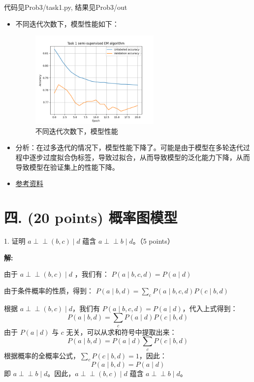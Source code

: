 \documentclass[8pt]{article}
\begin{document}
{\color{red}代码见Prob3/task1.py, 结果见Prob3/out}

\begin{itemize}
    \item 不同迭代次数下，模型性能如下：
    \begin{figure}[H]
        \centering
        \includegraphics[width=0.6\textwidth]{Prob3/out/task1_epochs.png}
        \caption{不同迭代次数下，模型性能}
        \label{fig:Model Performance under Different Iterations}
    \end{figure}
    \item 分析：在过多迭代的情况下，模型性能下降了。可能是由于模型在多轮迭代过程中逐步过度拟合伪标签，导致过拟合，从而导致模型的泛化能力下降，从而导致模型在验证集上的性能下降。
    \item \href{https://developer.baidu.com/article/detail.html?id=3034276}{参考资料}
\end{itemize}

\vspace{3em}

\newpage
\section*{四. (20 points) 概率图模型}

1. 证明 $a \perp\!\!\!\perp (b, c) \mid d$ 蕴含 $a \perp\!\!\!\perp b \mid d$。（5 points）

\textbf{\large 解:}

由于 $a \perp\!\!\!\perp (b, c) \mid d$ ，我们有：
$
P(a \mid b, c, d) = P(a \mid d)
$

由于条件概率的性质，得到：
$
P(a \mid b, d) = \sum_c P(a \mid b, c, d) P(c \mid b, d)
$

根据 $a \perp\!\!\!\perp (b, c) \mid d$，我们有 $P(a \mid b, c, d) = P(a \mid d)$，代入上式得到：
\[
P(a \mid b, d) = \sum_c P(a \mid d) P(c \mid b, d)
\]
由于 $P(a \mid d)$ 与 $c$ 无关，可以从求和符号中提取出来：
\[
P(a \mid b, d) = P(a \mid d) \sum_c P(c \mid b, d)
\]
根据概率的全概率公式，$\sum_c P(c \mid b, d) = 1$，因此：
\[
P(a \mid b, d) = P(a \mid d)
\]
即 $a \perp\!\!\!\perp b \mid d$。因此，$a \perp\!\!\!\perp (b, c) \mid d$ 蕴含 $a \perp\!\!\!\perp b \mid d$。
\end{document}

